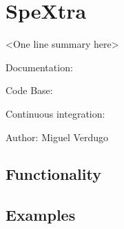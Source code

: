 

\section{SpeXtra%
  \label{spextra}%
}

<One line summary here>

Documentation:

Code Base:

Continuous integration:

Author: Miguel Verdugo


\subsection{Functionality%
  \label{functionality}%
}


\subsection{Examples%
  \label{examples}%
}
